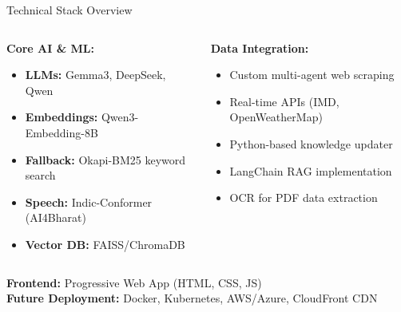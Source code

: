 \documentclass[aspectratio=169]{beamer}
\begin{document}
\begin{frame}{Technical Stack Overview}
\begin{columns}
\begin{column}{0.5\textwidth}
\textbf{Core AI \& ML:}
\begin{itemize}
\item \textbf{LLMs:} Gemma3, DeepSeek, Qwen
\item \textbf{Embeddings:} Qwen3-Embedding-8B
\item \textbf{Fallback:} Okapi-BM25 keyword search
\item \textbf{Speech:} Indic-Conformer (AI4Bharat)
\item \textbf{Vector DB:} FAISS/ChromaDB
\end{itemize}
\end{column}
\begin{column}{0.5\textwidth}
\textbf{Data Integration:}
\begin{itemize}
\item Custom multi-agent web scraping
\item Real-time APIs (IMD, OpenWeatherMap)
\item Python-based knowledge updater
\item LangChain RAG implementation
\item OCR for PDF data extraction
\end{itemize}
\end{column}
\end{columns}

\vspace{0.5cm}
\textbf{Frontend:} Progressive Web App (HTML, CSS, JS) \\
\textbf{Future Deployment:} Docker, Kubernetes, AWS/Azure, CloudFront CDN
\end{frame}
\end{document}
